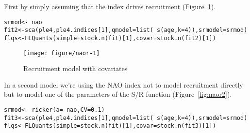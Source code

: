 \documentclass[a4paper,english,10pt]{article}\usepackage[]{graphicx}\usepackage[]{color}
\makeatletter
\def\maxwidth{ %
  \ifdim\Gin@nat@width>\linewidth
    \linewidth
  \else
    \Gin@nat@width
  \fi
}
\newcommand{\hlnum}[1]{\textcolor[rgb]{0.2,0.2,0.2}{#1}}%
\newcommand{\hlopt}[1]{\textcolor[rgb]{0.2,0.2,0.2}{#1}}%
\newcommand{\hlstd}[1]{\textcolor[rgb]{0,0,0}{#1}}%
\newcommand{\hlkwb}[1]{\textcolor[rgb]{0.361,0.506,0.596}{#1}}%
\newcommand{\hlkwc}[1]{\textcolor[rgb]{0.361,0.506,0.596}{#1}}%
\newcommand{\hlkwd}[1]{\textcolor[rgb]{0.361,0.506,0.596}{#1}}%
\newenvironment{kframe}{%
 \def\at@end@of@kframe{}%
 \ifinner\ifhmode%
  \def\at@end@of@kframe{\end{minipage}}%
  \begin{minipage}{\columnwidth}%
 \fi\fi%
 \def\FrameCommand##1{\hskip\@totalleftmargin \hskip-\fboxsep
 \colorbox{shadecolor}{##1}\hskip-\fboxsep
     \hskip-\linewidth \hskip-\@totalleftmargin \hskip\columnwidth}%
 \MakeFramed {\advance\hsize-\width
   \@totalleftmargin\z@ \linewidth\hsize
   \@setminipage}}%
 {\par\unskip\endMakeFramed%
 \at@end@of@kframe}
\newenvironment{knitrout}{}{} %
\makeatother
\begin{document}
First by simply assuming that the index drives recruitment (Figure~\ref{fig:naor}).

\begin{knitrout}
\color{fgcolor}\begin{kframe}
\begin{alltt}
\hlstd{srmod} \hlkwb{<-} \hlopt{~} \hlstd{nao}
\hlstd{fit2} \hlkwb{<-} \hlkwd{sca}\hlstd{(ple4, ple4.indices[}\hlnum{1}\hlstd{],} \hlkwc{qmodel}\hlstd{=}\hlkwd{list}\hlstd{(}\hlopt{~}\hlkwd{s}\hlstd{(age,} \hlkwc{k}\hlstd{=}\hlnum{4}\hlstd{)),} \hlkwc{srmodel}\hlstd{=srmod)}
\hlstd{flqs} \hlkwb{<-} \hlkwd{FLQuants}\hlstd{(}\hlkwc{simple}\hlstd{=}\hlkwd{stock.n}\hlstd{(fit)[}\hlnum{1}\hlstd{],} \hlkwc{covar}\hlstd{=}\hlkwd{stock.n}\hlstd{(fit2)[}\hlnum{1}\hlstd{])}
\end{alltt}
\end{kframe}
\end{knitrout}

\begin{knitrout}
\color{fgcolor}\begin{figure}[H]

{\centering \texttt{[image: figure/naor-1]} 

}

\caption[Recruitment model with covariates]{Recruitment model with covariates\label{fig:naor}}
\end{figure}


\end{knitrout}

In a second model we're using the NAO index not to model recruitment directly but to model one of the parameters of the S/R function (Figure~\ref{fig:naor2}). 

\begin{knitrout}
\color{fgcolor}\begin{kframe}
\begin{alltt}
\hlstd{srmod} \hlkwb{<-} \hlopt{~} \hlkwd{ricker}\hlstd{(}\hlkwc{a}\hlstd{=}\hlopt{~}\hlstd{nao,} \hlkwc{CV}\hlstd{=}\hlnum{0.1}\hlstd{)}
\hlstd{fit3} \hlkwb{<-} \hlkwd{sca}\hlstd{(ple4, ple4.indices[}\hlnum{1}\hlstd{],} \hlkwc{qmodel}\hlstd{=}\hlkwd{list}\hlstd{(}\hlopt{~}\hlkwd{s}\hlstd{(age,} \hlkwc{k}\hlstd{=}\hlnum{4}\hlstd{)),} \hlkwc{srmodel}\hlstd{=srmod)}
\hlstd{flqs} \hlkwb{<-} \hlkwd{FLQuants}\hlstd{(}\hlkwc{simple}\hlstd{=}\hlkwd{stock.n}\hlstd{(fit)[}\hlnum{1}\hlstd{],} \hlkwc{covar}\hlstd{=}\hlkwd{stock.n}\hlstd{(fit3)[}\hlnum{1}\hlstd{])}
\end{alltt}
\end{kframe}
\end{knitrout}
\end{document}
